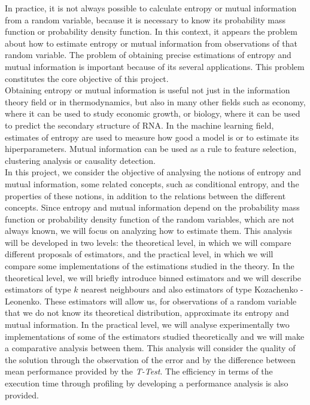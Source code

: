 In practice, it is not always possible to calculate entropy or mutual information from a random variable, because it is necessary to know its probability mass function or probability density function. In this context, it appears the problem about how to estimate entropy or mutual information from observations of that random variable. The problem of obtaining precise estimations of entropy and mutual information is important because of its several applications. This problem constitutes the core objective of this project.\\

Obtaining entropy or mutual information is useful not just in the information theory field or in thermodynamics, but also in many other fields such as economy, where it can be used to study economic growth, or biology, where it can be used to predict the secondary structure of RNA. In the machine learning field, estimates of entropy are used to measure how good a model is or to estimate its hiperparameters. Mutual information can be used as a rule to feature selection, clustering analysis or causality detection.\\

In this project, we consider the objective of analysing the notions of entropy and mutual information, some related concepts, such as conditional entropy, and the properties of these notions, in addition to the relations between the different concepts. Since entropy and mutual information depend on the probability mass function or probability density function of the random variables, which are not always known, we will focus on analyzing how to estimate them. This analysis will be developed in two levels: the theoretical level, in which we will compare different proposals of estimators, and the practical level, in which we will compare some implementations of the estimations studied in the theory. In the theoretical level, we will briefly introduce binned estimators and we will describe estimators of type $k$ nearest neighbours and also estimators of type Kozachenko - Leonenko. These estimators will allow us, for observations of a random variable that we do not know its theoretical distribution, approximate its entropy and mutual information. In the practical level, we will analyse experimentally two implementations of some of the estimators studied theoretically and we will make a comparative analysis between them. This analysis will consider the quality of the solution through the observation of the error and by the difference between mean performance provided by the \textit{T-Test}. The efficiency in terms of the execution time through profiling by developing a performance analysis is also provided.\\

